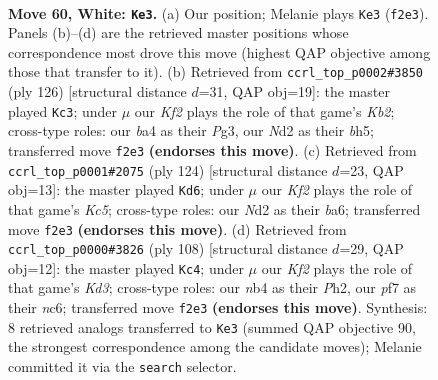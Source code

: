 \documentclass[11pt]{article}
\begin{document}
\clearpage

\begin{figure}[p]\centering
\begin{subfigure}{0.46\textwidth}\centering
\resizebox{\linewidth}{!}{%
\newchessgame
\chessboard[
  setfen={5k2/2r2p1p/6p1/4P3/bn3Pp1/8/3N1K1P/1B6 w - - 10 60},
  showmover=false,
  pgfstyle=straightmove, color=movearrow, markmove={f2-e3}
]}
\caption{}
\end{subfigure}\hfill
\begin{subfigure}{0.46\textwidth}\centering
\resizebox{\linewidth}{!}{%
\newchessgame
\chessboard[
  setfen={5B2/1k3p1p/1p6/2p3Pb/2P5/P5P1/1K6/8 w - - 9 64},
  showmover=false,
  pgfstyle=straightmove, color=movearrow, markmove={b2-c3}
]}
\caption{}
\end{subfigure}
\\[4pt]
\begin{subfigure}{0.46\textwidth}\centering
\resizebox{\linewidth}{!}{%
\newchessgame
\chessboard[
  setfen={3B4/6k1/b4p1p/2K1p1pB/8/6P1/5P1P/8 w - - 5 63},
  showmover=false,
  pgfstyle=straightmove, color=movearrow, markmove={c5-d6}
]}
\caption{}
\end{subfigure}\hfill
\begin{subfigure}{0.46\textwidth}\centering
\resizebox{\linewidth}{!}{%
\newchessgame
\chessboard[
  setfen={8/2B4p/2n3p1/4pp2/k7/3K1PP1/7P/8 w - - 0 55},
  showmover=false,
  pgfstyle=straightmove, color=movearrow, markmove={d3-c4}
]}
\caption{}
\end{subfigure}
\caption{\textbf{Move 60, White: \texttt{Ke3}.} (a) Our position; Melanie plays \texttt{Ke3} (\texttt{f2e3}). Panels (b)--(d) are the retrieved master positions whose correspondence most drove this move (highest QAP objective among those that transfer to it). (b) Retrieved from \texttt{ccrl\_top\_p0002\#3850} (ply 126) [structural distance $d$=31, QAP obj=19]: the master played \texttt{Kc3}; under $\mu$ our \emph{Kf2} plays the role of that game's \emph{Kb2}; cross-type roles: our \emph{b}a4 as their \emph{P}g3, our \emph{N}d2 as their \emph{b}h5; transferred move \texttt{f2e3} \textbf{(endorses this move)}. (c) Retrieved from \texttt{ccrl\_top\_p0001\#2075} (ply 124) [structural distance $d$=23, QAP obj=13]: the master played \texttt{Kd6}; under $\mu$ our \emph{Kf2} plays the role of that game's \emph{Kc5}; cross-type roles: our \emph{N}d2 as their \emph{b}a6; transferred move \texttt{f2e3} \textbf{(endorses this move)}. (d) Retrieved from \texttt{ccrl\_top\_p0000\#3826} (ply 108) [structural distance $d$=29, QAP obj=12]: the master played \texttt{Kc4}; under $\mu$ our \emph{Kf2} plays the role of that game's \emph{Kd3}; cross-type roles: our \emph{n}b4 as their \emph{P}h2, our \emph{p}f7 as their \emph{n}c6; transferred move \texttt{f2e3} \textbf{(endorses this move)}. Synthesis: 8 retrieved analogs transferred to \texttt{Ke3} (summed QAP objective 90, the strongest correspondence among the candidate moves); Melanie committed it via the \texttt{search} selector.}
\label{fig:thought-m118}
\end{figure}
\end{document}
